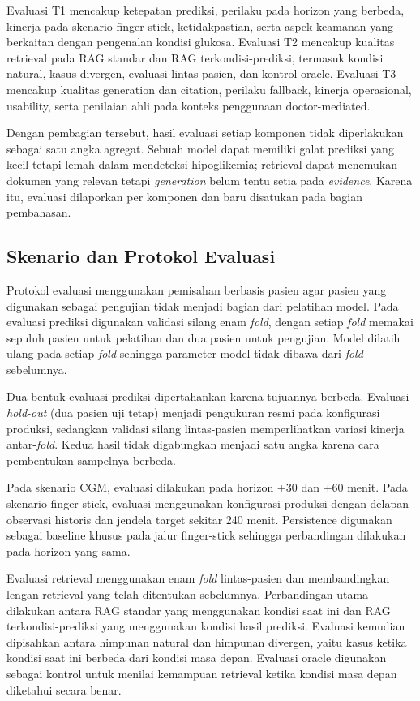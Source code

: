 Evaluasi T1 mencakup ketepatan prediksi, perilaku pada horizon yang berbeda, kinerja pada skenario finger-stick, ketidakpastian, serta aspek keamanan yang berkaitan
dengan pengenalan kondisi glukosa. Evaluasi T2 mencakup kualitas retrieval pada RAG standar dan RAG terkondisi-prediksi, termasuk kondisi natural, kasus divergen,
evaluasi lintas pasien, dan kontrol oracle. Evaluasi T3 mencakup kualitas generation dan citation, perilaku fallback, kinerja operasional, usability, serta penilaian
ahli pada konteks penggunaan doctor-mediated.

Dengan pembagian tersebut, hasil evaluasi setiap komponen tidak diperlakukan sebagai satu angka agregat. Sebuah model dapat memiliki galat prediksi yang kecil tetapi lemah dalam mendeteksi hipoglikemia; retrieval dapat menemukan dokumen yang relevan tetapi
\textit{generation} belum tentu setia pada \textit{evidence}. Karena itu, evaluasi dilaporkan per komponen dan baru disatukan pada bagian pembahasan.

\subsection{Skenario dan Protokol Evaluasi}
\label{subsec:bab6-skenario-protokol-evaluasi}

Protokol evaluasi menggunakan pemisahan berbasis pasien agar pasien yang digunakan sebagai pengujian tidak menjadi bagian dari pelatihan model. Pada evaluasi prediksi
digunakan validasi silang enam \textit{fold}, dengan setiap \textit{fold} memakai sepuluh pasien untuk pelatihan dan dua pasien untuk pengujian. Model dilatih ulang
pada setiap \textit{fold} sehingga parameter model tidak dibawa dari \textit{fold} sebelumnya.

Dua bentuk evaluasi prediksi dipertahankan karena tujuannya berbeda. Evaluasi \textit{hold-out} (dua pasien uji tetap) menjadi pengukuran resmi pada konfigurasi
produksi, sedangkan validasi silang lintas-pasien memperlihatkan variasi kinerja antar-\textit{fold}. Kedua hasil tidak digabungkan menjadi satu angka karena
cara pembentukan sampelnya berbeda.

Pada skenario CGM, evaluasi dilakukan pada horizon +30 dan +60 menit. Pada skenario finger-stick, evaluasi menggunakan konfigurasi produksi dengan delapan observasi
historis dan jendela target sekitar 240 menit. Persistence digunakan sebagai baseline khusus pada jalur finger-stick sehingga perbandingan dilakukan pada horizon
yang sama.

Evaluasi retrieval menggunakan enam \textit{fold} lintas-pasien dan membandingkan lengan retrieval yang telah ditentukan sebelumnya. Perbandingan utama dilakukan antara
RAG standar yang menggunakan kondisi saat ini dan RAG terkondisi-prediksi yang menggunakan kondisi hasil prediksi. Evaluasi kemudian dipisahkan antara himpunan
natural dan himpunan divergen, yaitu kasus ketika kondisi saat ini berbeda dari kondisi masa depan. Evaluasi oracle digunakan sebagai kontrol untuk menilai kemampuan
retrieval ketika kondisi masa depan diketahui secara benar.

